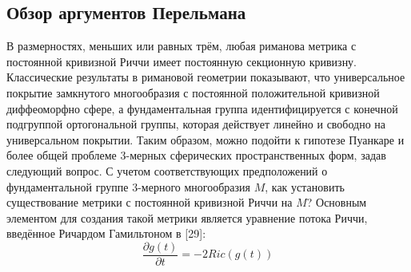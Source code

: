 \subsection{Обзор аргументов Перельмана}
В размерностях, меньших или равных трём, любая риманова метрика с 
постоянной кривизной Риччи имеет постоянную секционную кривизну. 
Классические результаты в римановой геометрии показывают, что 
универсальное покрытие замкнутого многообразия с постоянной 
положительной кривизной диффеоморфно сфере, а фундаментальная 
группа идентифицируется с конечной подгруппой ортогональной группы, 
которая действует линейно и свободно на универсальном покрытии. 
Таким образом, можно подойти к гипотезе Пуанкаре и более общей 
проблеме 3-мерных сферических пространственных форм, задав следующий 
вопрос. С учетом соответствующих предположений о фундаментальной 
группе 3-мерного многообразия $M$, как установить существование 
метрики с постоянной кривизной Риччи на $M$? 
Основным элементом для создания такой метрики является уравнение 
потока Риччи, введённое Ричардом Гамильтоном в [29]:
\[
\frac{\partial g(t)}{\partial t} = -2Ric(g(t))
\]
